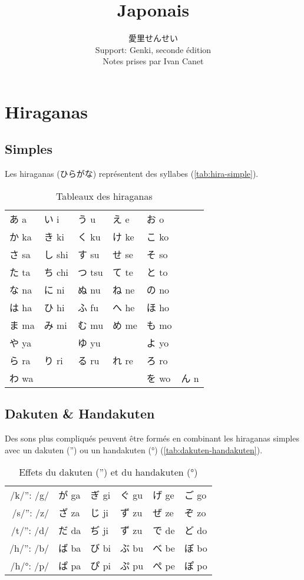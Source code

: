 \documentclass[a4paper,10pt,french,openany]{memoir}
\title{Japonais}
\author{愛里せんせい\\Support: Genki, seconde édition\\Notes prises par Ivan Canet}
\begin{document}
\maketitle
\tableofcontents

\chapter{Hiraganas}
\section{Simples}

Les hiraganas (ひらがな) représentent des syllabes (\autoref{tab:hira-simple}).

\begin{table}[htbp]
 \centering
 \begin{tabular}{llllll}
  あ a  & い i  & う u  & え e  & お o  &\\
  か ka & き ki & く ku & け ke & こ ko &\\
  さ sa & し shi& す su & せ se & そ so &\\
  た ta & ち chi& つ tsu& て te & と to &\\
  な na & に ni & ぬ nu & ね ne & の no &\\
  は ha & ひ hi & ふ fu & へ he & ほ ho &\\
  ま ma & み mi & む mu & め me & も mo &\\
  や ya & 　    & ゆ yu &　     & よ yo &\\
  ら ra & り ri & る ru & れ re & ろ ro &\\
  わ wa & 　    & 　    & 　    & を wo & ん n\\
 \end{tabular}
 \caption{Tableaux des hiraganas}
 \label{tab:hira-simple}
\end{table}

\section{Dakuten \& Handakuten}

Des sons plus compliqués peuvent être formés en combinant les hiraganas simples avec un dakuten ('') ou un handakuten (°) (\autoref{tab:dakuten-handakuten}).

\begin{table}[htbp]
 \centering
 \begin{tabular}{r|lllll}
  /k/'': /g/ & が ga & ぎ gi & ぐ gu & げ ge & ご go \\
  /s/'': /z/ & ざ za & じ ji & ず zu & ぜ ze & ぞ zo \\
  /t/'': /d/ & だ da & ぢ ji & ず zu & で de & ど do \\
  /h/'': /b/ & ば ba & び bi & ぶ bu & べ be & ぼ bo \\
  /h/°: /p/  & ぱ pa & ぴ pi & ぷ pu & ぺ pe & ぽ po \\
 \end{tabular}
 \caption{Effets du dakuten ('') et du handakuten (°)}
 \label{tab:dakuten-handakuten}
\end{table}
\end{document}
